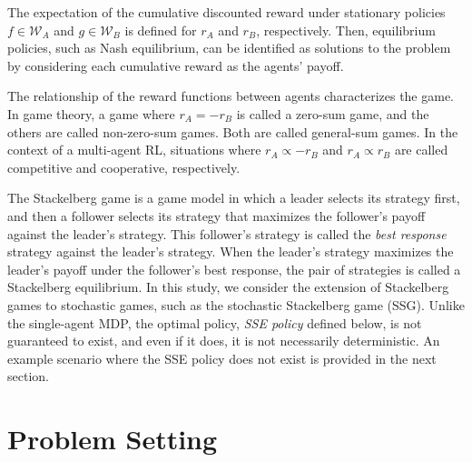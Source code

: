 \documentclass{acml}
\begin{document}
The expectation of the cumulative discounted reward under stationary policies $f\in\mathcal{W}_A$ and $g\in\mathcal{W}_B$ is defined for $r_A$ and $r_B$, respectively.
Then, equilibrium policies, such as Nash equilibrium, can be identified as solutions to the problem by considering each cumulative reward as the agents' payoff.

The relationship of the reward functions between agents characterizes the game. 
In game theory, a game where $r_A=-r_B$ is called a zero-sum game, and the others are called non-zero-sum games. Both are called general-sum games.
In the context of a multi-agent RL, situations where $r_A \propto -r_B$ and $r_A \propto r_B$ are called competitive and cooperative, respectively.

The Stackelberg game is a game model in which a leader selects its strategy first, and then a follower selects its strategy that maximizes the follower's payoff against the leader's strategy.
This follower's strategy is called the \emph{best response} strategy against the leader's strategy. 
When the leader's strategy maximizes the leader's payoff under the follower's best response, the pair of strategies is called a Stackelberg equilibrium.
In this study, we consider the extension of Stackelberg games to stochastic games, such as the stochastic Stackelberg game (SSG).
Unlike the single-agent MDP, the optimal policy, \emph{SSE policy} defined below, is not guaranteed to exist, and even if it does, it is not necessarily deterministic.
An example scenario where the SSE policy does not exist is provided in the next section.


\section{Problem Setting}\label{sec:problem_setting}

\end{document}
